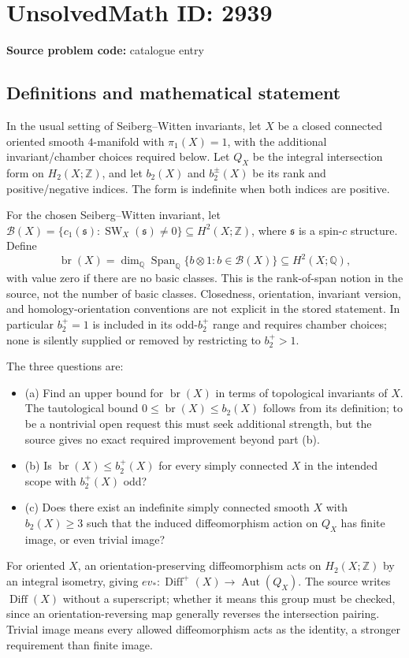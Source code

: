 \documentclass[11pt]{article}
\newcommand{\Z}{\mathbb{Z}}
\newcommand{\Q}{\mathbb{Q}}
\begin{document}
\section*{UnsolvedMath ID: 2939}
\textbf{Source problem code:} catalogue entry
\subsection{Definitions and mathematical statement}
In the usual setting of Seiberg--Witten invariants, let $X$ be a closed connected oriented smooth $4$-manifold with $\pi_1(X)=1$, with the additional invariant/chamber choices required below. Let $Q_X$ be the integral intersection form on $H_2(X;\Z)$, and let $b_2(X)$ and $b_2^\pm(X)$ be its rank and positive/negative indices. The form is indefinite when both indices are positive.

For the chosen Seiberg--Witten invariant, let $\mathcal B(X)=\{c_1(\mathfrak s):\operatorname{SW}_X(\mathfrak s)\ne0\}\subseteq H^2(X;\Z)$, where $\mathfrak s$ is a spin-$c$ structure. Define
\[\operatorname{br}(X)=\dim_{\Q}\operatorname{Span}_{\Q}\{b\otimes1:b\in\mathcal B(X)\}\subseteq H^2(X;\Q),\]
with value zero if there are no basic classes. This is the rank-of-span notion in the source, not the number of basic classes. Closedness, orientation, invariant version, and homology-orientation conventions are not explicit in the stored statement. In particular $b_2^+=1$ is included in its odd-$b_2^+$ range and requires chamber choices; none is silently supplied or removed by restricting to $b_2^+>1$.

The three questions are:
\begin{itemize}
\item (a) Find an upper bound for $\operatorname{br}(X)$ in terms of topological invariants of $X$. The tautological bound $0\leq\operatorname{br}(X)\leq b_2(X)$ follows from its definition; to be a nontrivial open request this must seek additional strength, but the source gives no exact required improvement beyond part (b).
\item (b) Is $\operatorname{br}(X)\leq b_2^+(X)$ for every simply connected $X$ in the intended scope with $b_2^+(X)$ odd?
\item (c) Does there exist an indefinite simply connected smooth $X$ with $b_2(X)\geq3$ such that the induced diffeomorphism action on $Q_X$ has finite image, or even trivial image?
\end{itemize}
For oriented $X$, an orientation-preserving diffeomorphism acts on $H_2(X;\Z)$ by an integral isometry, giving $ev_*:\operatorname{Diff}^+(X)\to\operatorname{Aut}(Q_X)$. The source writes $\operatorname{Diff}(X)$ without a superscript; whether it means this group must be checked, since an orientation-reversing map generally reverses the intersection pairing. Trivial image means every allowed diffeomorphism acts as the identity, a stronger requirement than finite image.
\end{document}

